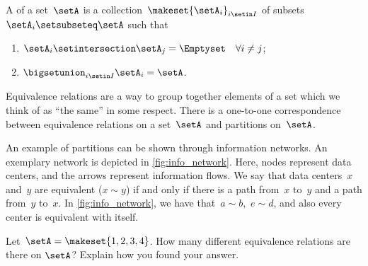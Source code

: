 \begin{ctdefinition}[Partition]
    \label{def:partition}
    A \emph{} of a set~$\setA$ is a collection~$\makeset{\setA_i}_{i\setin I}$ of subsets~$\setA_i\setsubseteq \setA$ such that
    \begin{enumerate}
        \item $\setA_i\setintersection \setA_j=\Emptyset \quad \forall i\neq j$;
        \item $\bigsetunion_{i\setin I}\setA_i=\setA$.
    \end{enumerate}
\end{ctdefinition}

\begin{remark}
    Equivalence relations are a way to group together elements of a set which we think of as ``the same'' in some respect.
    There is a one-to-one correspondence between equivalence relations on a set~$\setA$ and partitions on~$\setA$.
\end{remark}

\begin{marginfigure}
    \centering
    \caption{
        \label{fig:info_network}
    }
\end{marginfigure}

\begin{example}
    An example of partitions can be shown through information networks.
    An exemplary network is depicted in \cref{fig:info_network}.
    Here, nodes represent data centers, and the arrows represent information flows.
    We say that data centers~$x$ and~$y$ are equivalent ($x\sim y$) if and only if there is a path from~$x$ to~$y$ and a path from~$y$ to~$x$.
    In \cref{fig:info_network}, we have that~$a\sim b$,~$e\sim d$, and also every center is equivalent with itself.
\end{example}

\vfill
\begin{gradedexercise}
    \label{ex:CountingEquivalenceRelations}
    Let~$\setA = \makeset{ 1, 2, 3, 4 }$.
    How many different equivalence relations are there on $\setA$?
    Explain how you found your answer.
\end{gradedexercise}

